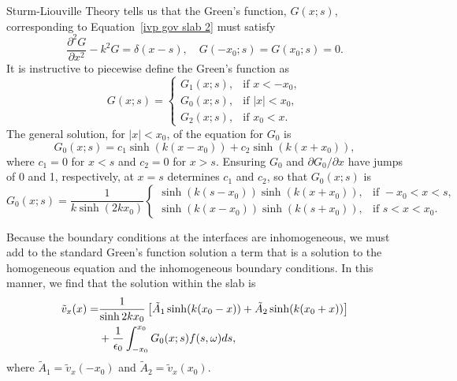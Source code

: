 \documentclass[12pt, draft]{../style-files/ociamthesis}
\begin{document}
Sturm-Liouville Theory tells us that the Green's function, $G(x;s)$, corresponding to Equation~\eqref{ivp gov slab 2} must satisfy 
\begin{equation}
\frac{\partial^2G}{\partial x^2} - k^2 G = \delta(x - s), \quad G(-x_0; s) = G(x_0; s) = 0.
\end{equation}
It is instructive to piecewise define the Green's function as
\begin{equation}
G(x; s) = 
\begin{cases}
G_1(x; s), & \text{if } x < -x_0, \\
G_0(x; s), & \text{if } |x| < x_0, \\
G_2(x; s), & \text{if } x_0 < x.
\end{cases}
\end{equation}
The general solution, for $|x| < x_0$, of the equation for $G_0$ is
\begin{equation}
G_0(x; s) = c_1\sinh(k(x - x_0)) + c_2\sinh(k(x + x_0)),
\end{equation}
where $c_1 = 0$ for $x < s$ and $c_2 = 0$ for $x > s$. Ensuring $G_0$ and $\partial G_0 / \partial x$ have jumps of 0 and 1, respectively, at $x = s$  determines $c_1$ and $c_2$, so that $G_0(x;s)$ is
\begin{equation}
G_0(x;s) = \frac{1}{k\sinh(2k x_0)}
\begin{cases}
\sinh(k(s - x_0))\sinh(k(x + x_0)), & \text{if } -x_0<x<s, \\
\sinh(k(x - x_0))\sinh(k(s + x_0)), & \text{if } s<x<x_0.
\end{cases}
\end{equation}

Because the boundary conditions at the interfaces are inhomogeneous, we must add to the standard Green's function solution a term that is a solution to the homogeneous equation and the inhomogeneous boundary conditions. In this manner, we find that the solution within the slab is
\begin{align}
\tilde{v}_x(x) = &\frac{1}{\sinh{2kx_0}} \left[ \tilde{A}_1\sinh(k(x_0 - x)) + \tilde{A}_2\sinh(k(x_0 + x)) \right] \notag \\
&+ \frac{1}{\epsilon_0}\int_{-x_0}^{x_0} G_0(x;s) f(s, \omega) ds,
\label{sol 0}
\end{align}
where $\tilde{A}_1 = \tilde{v}_x(-x_0)$ and $\tilde{A}_2 = \tilde{v}_x(x_0)$.
\end{document}
